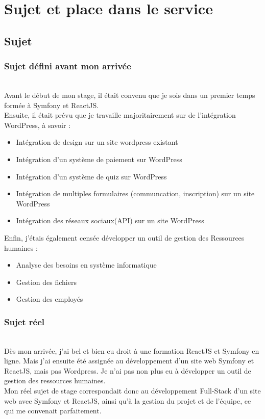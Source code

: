 \section{Sujet et place dans le service}
\subsection{Sujet}
\subsubsection{Sujet défini avant mon arrivée}
~\\
Avant le début de mon stage, il était convenu que je sois dans un premier temps formée à Symfony et ReactJS.
\\
Ensuite, il était prévu que je travaille majoritairement sur de l'intégration WordPress, à savoir :
\begin{itemize}
    \item Intégration de design sur un site wordpress existant
    \item Intégration d’un système de paiement sur WordPress
    \item Intégration d’un système de quiz sur WordPress
    \item Intégration de multiples formulaires (communcation, inscription) sur un site 
    WordPress
    \item Intégration des réseaux sociaux(API) sur un site WordPress
\end{itemize}
\bigbreak
Enfin, j'étais également censée développer un outil de gestion des Ressources humaines :
\begin{itemize}
    \item Analyse des besoins en système informatique
    \item Gestion des fichiers
    \item Gestion des employés
\end{itemize}


\subsubsection{Sujet réel}
~\\
Dès mon arrivée, j'ai bel et bien eu droit à une formation ReactJS et Symfony en ligne.
Mais j'ai ensuite été assignée au développement d'un site web Symfony et ReactJS, mais pas Wordpress.
Je n'ai pas non plus eu à développer un outil de gestion des ressources humaines. 
\\
Mon réel sujet de stage correspondait donc au développement Full-Stack d'un site web avec Symfony et ReactJS, 
ainsi qu'à la gestion du projet et de l'équipe, ce qui me convenait parfaitement.

